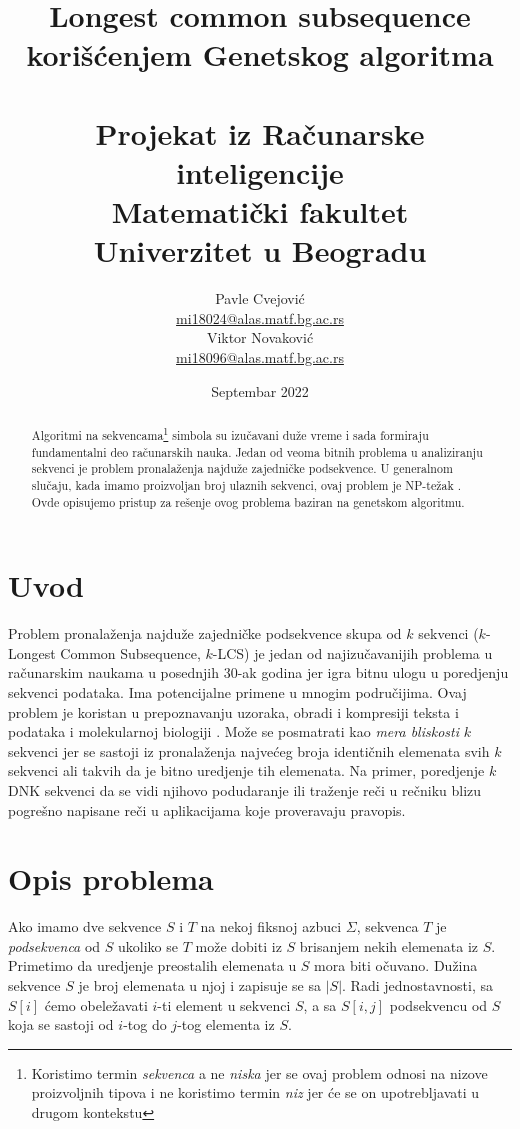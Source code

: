 \documentclass{article}
\title{%
    Longest common subsequence korišćenjem Genetskog algoritma \\~\\
    \large Projekat iz Računarske inteligencije \\
    Matematički fakultet \\
    Univerzitet u Beogradu
}
\author{
    Pavle Cvejović\\
    \href{mailto:mi18024@alas.matf.bg.ac.rs}{mi18024@alas.matf.bg.ac.rs} \\
    Viktor Novaković\\
    \href{mailto:mi18096@alas.matf.bg.ac.rs}{mi18096@alas.matf.bg.ac.rs} \\
}
\date{Septembar 2022}
\begin{document}
    \renewcommand{\abstractname}{Apstrakt}

    \maketitle

    \begin{abstract}
        Algoritmi na sekvencama\footnote{Koristimo termin \emph{sekvenca} a ne \emph{niska} jer se ovaj problem odnosi na nizove proizvoljnih tipova i ne koristimo termin \emph{niz} jer će se on upotrebljavati u drugom kontekstu}  simbola su izučavani duže vreme i sada formiraju fundamentalni deo računarskih nauka. Jedan od veoma bitnih problema u analiziranju sekvenci je problem pronalaženja najduže zajedničke podsekvence. U generalnom slučaju, kada imamo proizvoljan broj ulaznih sekvenci, ovaj problem je NP-težak \cite{np}. Ovde opisujemo pristup za rešenje ovog problema baziran na genetskom algoritmu.
    \end{abstract}

    \pagebreak

    \tableofcontents

    \pagebreak


    \section{Uvod}
    Problem pronalaženja najduže zajedničke podsekvence skupa od $k$ sekvenci ($k$-Longest Common Subsequence, $k$-LCS) je jedan od najizučavanijih problema u računarskim naukama u posednjih 30-ak godina jer igra bitnu ulogu u poredjenju sekvenci podataka. Ima potencijalne primene u mnogim područijima. Ovaj problem je koristan u prepoznavanju uzoraka, obradi i kompresiji teksta i podataka \cite{dc} i molekularnoj biologiji \cite{cg}. Može se posmatrati kao \emph{mera bliskosti} $k$ sekvenci jer se sastoji iz pronalaženja najvećeg broja identičnih elemenata svih $k$ sekvenci ali takvih da je bitno uredjenje tih elemenata. Na primer, poredjenje $k$ DNK sekvenci da se vidi njihovo podudaranje ili traženje reči u rečniku blizu pogrešno napisane reči u aplikacijama koje proveravaju pravopis.


    \section{Opis problema}

    Ako imamo dve sekvence $S$ i $T$ na nekoj fiksnoj azbuci $\Sigma$, sekvenca $T$ je \emph{podsekvenca} od $S$ ukoliko se $T$ može dobiti iz $S$ brisanjem nekih elemenata iz $S$. Primetimo da uredjenje preostalih elemenata u $S$ mora biti očuvano. Dužina sekvence $S$ je broj elemenata u njoj i zapisuje se sa $|S|$. Radi jednostavnosti, sa $S[i]$ ćemo obeležavati $i$-ti element u sekvenci $S$, a sa $S[i,j]$ podsekvencu od $S$ koja se sastoji od $i$-tog do $j$-tog elementa iz $S$. \\
\end{document}
